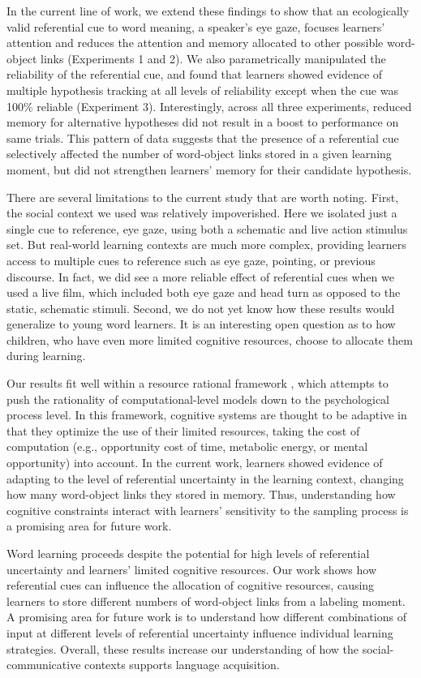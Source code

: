 \documentclass[10pt,letterpaper]{article}
\begin{document}
In the current line of work, we extend these findings to show that an ecologically valid referential cue to word meaning, a speaker's eye gaze, focuses learners' attention and reduces the attention and memory allocated to other possible word-object links (Experiments 1 and 2). We also parametrically manipulated the reliability of the referential cue, and found that learners showed evidence of multiple hypothesis tracking at all levels of reliability except when the cue was 100\% reliable (Experiment 3). Interestingly, across all three experiments, reduced memory for alternative hypotheses did not result in a boost to performance on same trials. This pattern of data suggests that the presence of a referential cue selectively affected the number of word-object links stored in a given learning moment, but did not strengthen learners' memory for their candidate hypothesis. 

There are several limitations to the current study that are worth noting. First, the social context we used was relatively impoverished. Here we isolated just a single cue to reference, eye gaze, using both a schematic and live action stimulus set. But real-world learning contexts are much more complex, providing learners access to multiple cues to reference such as eye gaze, pointing, or previous discourse. In fact, we did see a more reliable effect of referential cues when we used a live film, which included both eye gaze and head turn as opposed to the static, schematic stimuli. Second, we do not yet know how these results would generalize to young word learners. It is an interesting open question as to how children, who have even more limited cognitive resources, choose to allocate them during learning.

Our results fit well within a resource rational framework \cite{griffiths2014rational}, which attempts to push the rationality of computational-level models down to the psychological process level. In this framework, cognitive systems are thought to be adaptive in that they optimize the use of their limited resources, taking the cost of computation (e.g., opportunity cost of time, metabolic energy, or mental opportunity) into account. In the current work, learners showed evidence of adapting to the level of referential uncertainty in the learning context,  changing how many word-object links they stored in memory.  Thus, understanding how cognitive constraints interact with learners' sensitivity to the sampling process is a promising area for future work.

Word learning proceeds despite the potential for high levels of referential uncertainty and learners' limited cognitive resources. Our work shows how referential cues can influence the allocation of cognitive resources, causing learners to store different numbers of word-object links from a labeling moment. A promising area for future work is to understand how different combinations of input at different levels of referential uncertainty influence individual learning strategies. Overall, these results increase our understanding of how the social-communicative contexts supports language acquisition. 
\end{document}
